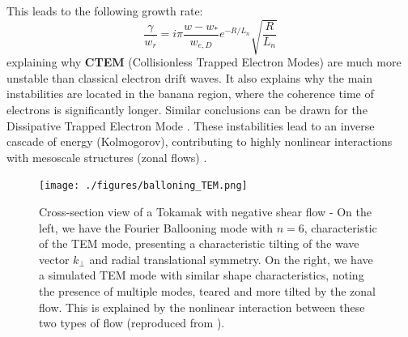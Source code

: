 \documentclass[11pt,a4paper,openany]{report}
\begin{document}
\begin{multicols}{2}
    This leads to the following growth rate:
    $$\frac{\gamma}{w_r} = i \pi \frac{w - w_*}{w_{e,D}} e^{-R/L_n} \sqrt{\frac{R}{L_n}}$$
    explaining why \textbf{CTEM} (Collisionless Trapped Electron Modes) are much more unstable than classical electron drift waves. It also explains why the main instabilities are located in the banana region, where the coherence time of electrons is significantly longer. Similar conclusions can be drawn for the Dissipative Trapped Electron Mode \cite{Trapped_Particle_Mode}. These instabilities lead to an inverse cascade of energy (Kolmogorov), contributing to highly nonlinear interactions with mesoscale structures (zonal flows) \cite{San_diego, Krutkin_thesis, DW_transport}.
\end{multicols}
\begin{figure}[H]
    \centering
    \texttt{[image: ./figures/balloning\_TEM.png]}
    \caption{Cross-section view of a Tokamak with negative shear flow - On the left, we have the Fourier Ballooning mode with \( n = 6 \), characteristic of the TEM mode, presenting a characteristic tilting of the wave vector \( k_{\perp} \) and radial translational symmetry. On the right, we have a simulated TEM mode with similar shape characteristics, noting the presence of multiple modes, teared and more tilted by the zonal flow. This is explained by the nonlinear interaction between these two types of flow (reproduced from \cite{TEM_simulation, Ballooning_transform}).}
    \label{}
\end{figure}
\end{document}
